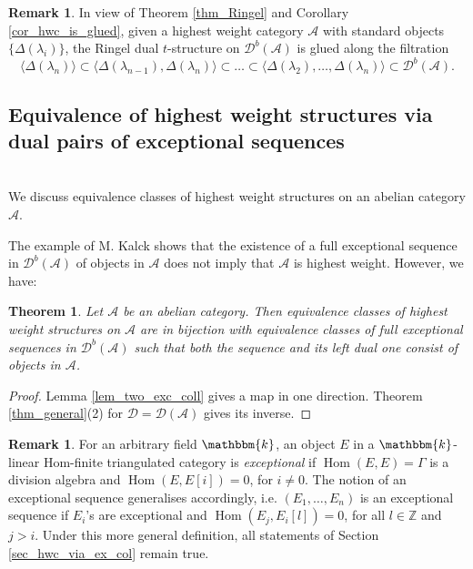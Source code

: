 \documentclass[12pt,a4paper]{amsart}
\newcommand{\aA}{{\mathcal{A}}}
\newcommand{\dD}{{\mathcal{D}}}
\newcommand{\la}{\lambda}
\newcommand{\kk}{\mathbbm{k}}
\newcommand{\tr}{{\mbox{$t$-struc}\-tu\-r}}
\newcommand{\Hom}{\mathop{\textrm{Hom}}\nolimits}
\newtheorem{THM}[LEM]{Theorem}
\theoremstyle{definition}
\newtheorem{REM}[LEM]{Remark}
\begin{document}
\begin{REM}\label{rem_dual_filt}
In view of Theorem \ref{thm_Ringel} and Corollary \ref{cor_hwc_is_glued}, given a highest weight category $\aA$ with standard objects $\{\Delta(\la_i)\}$, the Ringel dual \tr e on $\dD^b(\aA)$ is glued along the filtration
$$
\langle \Delta(\la_n) \rangle \subset \langle \Delta(\la_{n-1}), \Delta(\la_n) \rangle \subset \ldots \subset \langle \Delta(\la_2), \ldots, \Delta(\la_n)\rangle \subset \dD^b(\aA).
$$
\end{REM}

\vspace{0.3cm}
\subsection{Equivalence of highest weight structures via dual pairs of exceptional sequences}~\\

We discuss equivalence classes of highest weight structures on an abelian category $\aA$.



The example of M. Kalck \cite[Proposition 5.6]{Kalck} shows that the existence of a full exceptional sequence in $\dD^b(\aA)$ of objects in $\aA$ does not imply that $\aA$ is highest weight. However, we have:  

\begin{THM}\label{thm_main}
	Let $\aA$ be an abelian category. Then equivalence classes of highest weight structures on $\aA$ are in bijection with equivalence classes of full exceptional sequences in $\dD^b(\aA)$ such that both the sequence and its left dual one consist of objects in $\aA$.
\end{THM} 
\begin{proof}
	Lemma \ref{lem_two_exc_coll} gives a map in one direction. Theorem \ref{thm_general}(2) for $\dD= \dD(\aA)$ gives its inverse.
\end{proof}



\begin{REM}
For an arbitrary field $\kk$, an object $E$ in a $\kk$-linear Hom-finite triangulated category is \emph{exceptional} if $\Hom(E,E)=\Gamma$ is a division algebra and $\Hom(E,E[i])=0$, for $i\neq 0$. 
The notion of an exceptional sequence generalises accordingly, i.e. $(E_1, \ldots, E_n)$ is an exceptional sequence if $E_i$'s are exceptional and $\Hom(E_j,E_i[l])=0$, for all $l\in \mathbb{Z}$ and $j>i$. Under this more general definition, all 
statements of Section \ref{sec_hwc_via_ex_col} remain true. 
\end{REM}
\end{document}
